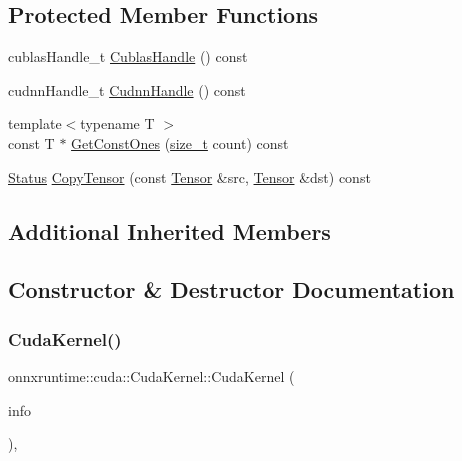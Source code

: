 \subsection*{Protected Member Functions}
\begin{DoxyCompactItemize}
\item 
cublas\+Handle\+\_\+t \mbox{\hyperlink{classonnxruntime_1_1cuda_1_1CudaKernel_a7720970f9afec128e98318aee7274c0a}{Cublas\+Handle}} () const
\item 
cudnn\+Handle\+\_\+t \mbox{\hyperlink{classonnxruntime_1_1cuda_1_1CudaKernel_afc186873ab2730857320c8aa3150abb1}{Cudnn\+Handle}} () const
\item 
{\footnotesize template$<$typename T $>$ }\\const T $\ast$ \mbox{\hyperlink{classonnxruntime_1_1cuda_1_1CudaKernel_a7361d9eae9cec4835d86d0fc094c42ce}{Get\+Const\+Ones}} (\mbox{\hyperlink{mlasi_8h_a503efbc1c6e50825320ad909366b78ab}{size\+\_\+t}} count) const
\item 
\mbox{\hyperlink{classonnxruntime_1_1common_1_1Status}{Status}} \mbox{\hyperlink{classonnxruntime_1_1cuda_1_1CudaKernel_a045d2367220e7756805c0079a3165925}{Copy\+Tensor}} (const \mbox{\hyperlink{classonnxruntime_1_1Tensor}{Tensor}} \&src, \mbox{\hyperlink{classonnxruntime_1_1Tensor}{Tensor}} \&dst) const
\end{DoxyCompactItemize}
\subsection*{Additional Inherited Members}


\subsection{Constructor \& Destructor Documentation}
\mbox{\label{classonnxruntime_1_1cuda_1_1CudaKernel_a93fd220303820a25d350f9e336239056}} 
\subsubsection{\texorpdfstring{Cuda\+Kernel()}{CudaKernel()}}
{\footnotesize\ttfamily onnxruntime\+::cuda\+::\+Cuda\+Kernel\+::\+Cuda\+Kernel (\begin{DoxyParamCaption}\item[{const \mbox{\hyperlink{classonnxruntime_1_1OpKernelInfo}{Op\+Kernel\+Info}} \&}]{info }\end{DoxyParamCaption})\hspace{0.3cm}{\ttfamily [inline]}, {\ttfamily [explicit]}}



